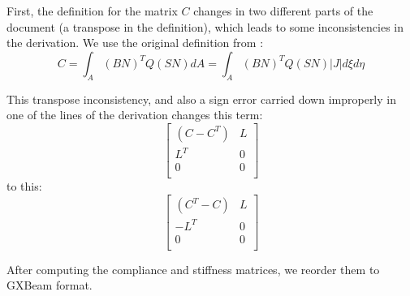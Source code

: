 \documentclass{article}
\begin{document}
First, the definition for the matrix $C$ changes in two different parts of the document (a transpose in the definition), which leads to some inconsistencies in the derivation.   We use the original definition from \cite{Giavotto1983}:
\begin{equation}
C = \int_A (BN)^T Q (SN) dA = \int_A (BN)^T Q (SN) |J| d\xi d\eta
\end{equation}

This transpose inconsistency, and also a sign error carried down improperly in one of the lines of the derivation changes this term:
\begin{equation}
\begin{bmatrix}
    (C - C^T) & L \\
    L^T & 0 \\
    0 & 0 \\
\end{bmatrix}
\end{equation}
to this:
\begin{equation}
\begin{bmatrix}
    (C^T - C) & L \\
    -L^T & 0 \\
    0 & 0 \\
\end{bmatrix}
\end{equation}

After computing the compliance and stiffness matrices, we reorder them to GXBeam format.





\end{document}
